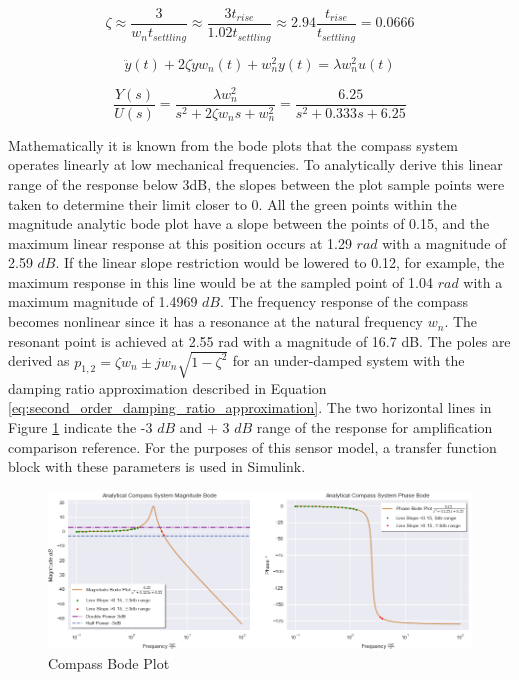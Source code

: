 \begin{equation}
    \zeta \approx \frac{3}{w_n t_{settling}} 
\approx \frac{3 t_{rise}}{1.02 t_{settling}}
\approx 2.94 \frac{t_{rise}}{t_{settling}} = 0.0666
\label{eq:second_order_damping_ratio_approximation}
\end{equation}


\begin{equation}
\ddot{y}(t) +2 \zeta \dot{y} w_n (t) + w_n^2 y(t) = \lambda w_n^2 u(t)
\label{eq:second_order_differential}
\end{equation}

\begin{equation}
\frac{Y(s)}{U(s)} =
\frac{\lambda w^{2}_{n}}{s^2 + 2 \zeta w_n s + w^{2}_{n}} =
\frac{6.25}{s^2 + 0.333s + 6.25} 
\label{eq:second_order_transfer_function}
\end{equation}

Mathematically it is known from the bode plots that the compass system operates linearly at low mechanical frequencies. To analytically derive this linear range of the response below 3dB, the slopes between the plot sample points were taken to determine their limit closer to 0. All the green points within the magnitude analytic bode plot have a slope between the points of 0.15, and the maximum linear response at this position occurs at 1.29 $rad$ with a magnitude of 2.59 $dB$. If the linear slope restriction would be lowered to 0.12, for example, the maximum response in this line would be at the sampled point of 1.04 $rad$ with a maximum magnitude of 1.4969 $dB$. The frequency response of the compass becomes nonlinear since it has a resonance at the natural frequency $w_n$. The resonant point is achieved at 2.55 rad with a magnitude of 16.7 dB. The poles are derived as $p_{1,2} = \zeta w_n \pm jw_n\sqrt{1 - \zeta^2}$ for an under-damped system \cite{ogata2010modern} with the damping ratio approximation described in Equation \ref{eq:second_order_damping_ratio_approximation}. The two horizontal lines in Figure \ref{fig:compass_bode_plots} indicate the -3 $dB$ and + 3 $dB$ range of the response for amplification comparison reference. For the purposes of this sensor model, a transfer function block with these parameters is used in Simulink.

\begin{figure}
    \centering
    \includegraphics[width=\textwidth]{img/compass_bode_plots.png}
    \caption{Compass Bode Plot}
    \label{fig:compass_bode_plots}
\end{figure}

